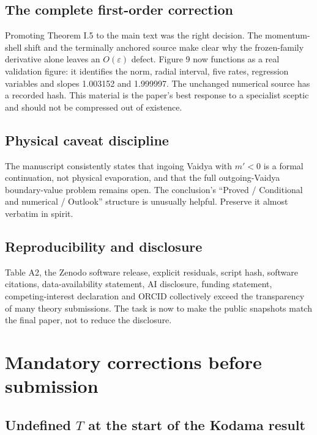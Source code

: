 \documentclass[11pt,a4paper]{article}
\begin{document}
\subsection{The complete first-order correction}

Promoting Theorem I.5 to the main text was the right decision. The momentum-shell shift and the
terminally anchored source make clear why the frozen-family derivative alone leaves an
$O(\varepsilon)$ defect. Figure 9 now functions as a real validation figure: it identifies the
norm, radial interval, five rates, regression variables and slopes 1.003152 and 1.999997. The
unchanged numerical source has a recorded hash. This material is the paper's best response to a
specialist sceptic and should not be compressed out of existence.

\subsection{Physical caveat discipline}

The manuscript consistently states that ingoing Vaidya with $m'<0$ is a formal continuation,
not physical evaporation, and that the full outgoing-Vaidya boundary-value problem remains
open. The conclusion's ``Proved / Conditional and numerical / Outlook'' structure is unusually
helpful. Preserve it almost verbatim in spirit.

\subsection{Reproducibility and disclosure}

Table A2, the Zenodo software release, explicit residuals, script hash, software citations,
data-availability statement, AI disclosure, funding statement, competing-interest declaration
and ORCID collectively exceed the transparency of many theory submissions. The task is now to
make the public snapshots match the final paper, not to reduce the disclosure.

\clearpage
\section{Mandatory corrections before submission}\label{sec:must}

\subsection{Undefined $T$ at the start of the Kodama result}
\end{document}

